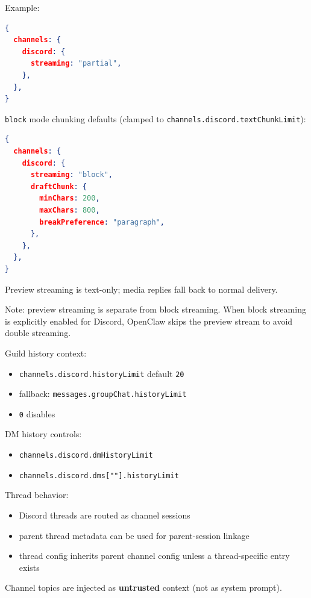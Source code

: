 Example:

\begin{lstlisting}[language=json]
{
  channels: {
    discord: {
      streaming: "partial",
    },
  },
}
\end{lstlisting}


\texttt{block} mode chunking defaults (clamped to \texttt{channels.discord.textChunkLimit}):

\begin{lstlisting}[language=json]
{
  channels: {
    discord: {
      streaming: "block",
      draftChunk: {
        minChars: 200,
        maxChars: 800,
        breakPreference: "paragraph",
      },
    },
  },
}
\end{lstlisting}


Preview streaming is text-only; media replies fall back to normal delivery.

Note: preview streaming is separate from block streaming. When block streaming is explicitly
enabled for Discord, OpenClaw skips the preview stream to avoid double streaming.


Guild history context:

\begin{itemize}
  \item \texttt{channels.discord.historyLimit} default \texttt{20}
  \item fallback: \texttt{messages.groupChat.historyLimit}
  \item \texttt{0} disables
\end{itemize}


DM history controls:

\begin{itemize}
  \item \texttt{channels.discord.dmHistoryLimit}
  \item \texttt{channels.discord.dms[""].historyLimit}
\end{itemize}


Thread behavior:

\begin{itemize}
  \item Discord threads are routed as channel sessions
  \item parent thread metadata can be used for parent-session linkage
  \item thread config inherits parent channel config unless a thread-specific entry exists
\end{itemize}


Channel topics are injected as \textbf{untrusted} context (not as system prompt).


